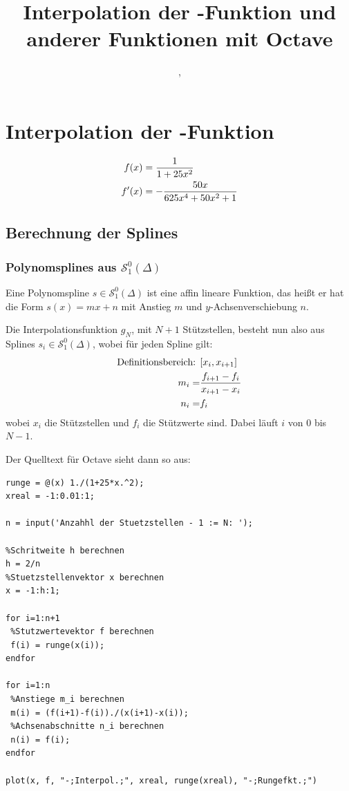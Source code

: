 \documentclass[ngerman,a4paper]{texmf/tex/latex/mathscript/mathscript}
\title{\textbf{Interpolation der \person{Runge}-Funktion und anderer Funktionen mit Octave}}
\author{\person{Henry Haustein}, \person{Lars Ortscheidt}}
\begin{document}
\maketitle
	
\tableofcontents
\pagebreak
	
\section{Interpolation der -Funktion}	
	\begin{align}
		f(x) &= \frac{1}{1+25x^2}\notag \\
		f' (x) &= -\frac{50x}{625x^4+50x^2+1}\notag
	\end{align}
	
	\subsection{Berechnung der Splines}\label{1.1}
	\subsubsection{Polynomsplines aus $\mathcal{S}_1^0(\Delta)$}
	
	Eine Polynomspline $s\in\mathcal{S}_1^0(\Delta)$ ist eine affin lineare Funktion, das heißt er hat die Form $s(x)=mx+n$ mit Anstieg $m$ und $y$-Achsenverschiebung $n$. 
	
	Die Interpolationsfunktion $g_N$, mit $N+1$ Stützstellen, besteht nun also aus Splines $s_i\in\mathcal{S}_1^0(\Delta)$, wobei für jeden Spline gilt:
	\begin{align}
		\text{Definitionsbereich: } & [x_i,x_{i+1}] \notag \\
		m_i =& \frac{f_{i+1}-f_i}{x_{i+1}-x_i}\notag \\
		n_i =& f_i \notag
	\end{align} 
	wobei $x_i$ die Stützstellen und $f_i$ die Stützwerte sind. Dabei läuft $i$ von $0$ bis $N-1$.
	
	Der Quelltext für Octave sieht dann so aus:
\begin{lstlisting}
runge = @(x) 1./(1+25*x.^2);
xreal = -1:0.01:1;

n = input('Anzahhl der Stuetzstellen - 1 := N: ');

%Schritweite h berechnen
h = 2/n
%Stuetzstellenvektor x berechnen
x = -1:h:1;

for i=1:n+1
 %Stutzwertevektor f berechnen
 f(i) = runge(x(i));
endfor

for i=1:n
 %Anstiege m_i berechnen
 m(i) = (f(i+1)-f(i))./(x(i+1)-x(i));
 %Achsenabschnitte n_i berechnen
 n(i) = f(i);
endfor

plot(x, f, "-;Interpol.;", xreal, runge(xreal), "-;Rungefkt.;")
\end{lstlisting}
\end{document}
